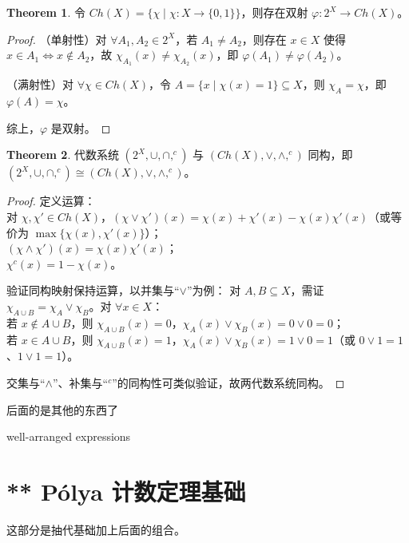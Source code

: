 \documentclass[oneside]{book}
\theoremstyle{definition}
\newtheorem{theorem}{Theorem}[section]
\begin{document}
	\begin{theorem}
		令 \( Ch(X) = \{ \chi \mid \chi: X \to \{ 0, 1 \} \} \)，则存在双射 \( \varphi: 2^X \to Ch(X) \)。
	\end{theorem}
	
	\begin{proof}
		（单射性）对 \( \forall A_1, A_2 \in 2^X \)，若 \( A_1 \neq A_2 \)，则存在 \( x \in X \) 使得 \( x \in A_1 \iff x \notin A_2 \)，故 \( \chi_{A_1}(x) \neq \chi_{A_2}(x) \)，即 \( \varphi(A_1) \neq \varphi(A_2) \)。
		
		（满射性）对 \( \forall \chi \in Ch(X) \)，令 \( A = \{ x \mid \chi(x) = 1 \} \subseteq X \)，则 \( \chi_A = \chi \)，即 \( \varphi(A) = \chi \)。
		
		综上，\( \varphi \) 是双射。
	\end{proof}
	
	\begin{theorem}
		代数系统 \( (2^X, \cup, \cap, ^c) \) 与 \( (Ch(X), \lor, \land, ^c) \) 同构，即 \( (2^X, \cup, \cap, ^c) \cong (Ch(X), \lor, \land, ^c) \)。
	\end{theorem}
	
	\begin{proof}
		定义运算：\\
		对 \( \chi, \chi' \in Ch(X) \)，\( (\chi \lor \chi')(x) = \chi(x) + \chi'(x) - \chi(x)\chi'(x) \)（或等价为 \( \max\{\chi(x), \chi'(x)\} \)）；\\
		\( (\chi \land \chi')(x) = \chi(x)\chi'(x) \)；\\
		\( \chi^c(x) = 1 - \chi(x) \)。
		
		验证同构映射保持运算，以并集与“\( \lor \)”为例：
		对 \( A, B \subseteq X \)，需证 \( \chi_{A \cup B} = \chi_A \lor \chi_B \)。对 \( \forall x \in X \)：\\
		若 \( x \notin A \cup B \)，则 \( \chi_{A \cup B}(x) = 0 \)，\( \chi_A(x) \lor \chi_B(x) = 0 \lor 0 = 0 \)；\\
		若 \( x \in A \cup B \)，则 \( \chi_{A \cup B}(x) = 1 \)，\( \chi_A(x) \lor \chi_B(x) = 1 \lor 0 = 1 \)（或 \( 0 \lor 1 = 1 \)、\( 1 \lor 1 = 1 \)）。
		
		交集与“\( \land \)”、补集与“\( ^c \)”的同构性可类似验证，故两代数系统同构。
	\end{proof}
	
	后面的是其他的东西了
	
	well-arranged expressions
	
	
	\section{** Pólya 计数定理基础}
	这部分是抽代基础加上后面的组合。
\end{document}
